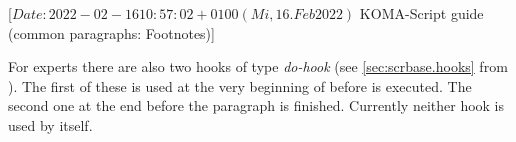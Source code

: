 %
%
%
%
%
%
%

                 [$Date: 2022-02-16 10:57:02 +0100 (Mi, 16. Feb 2022) $
                  KOMA-Script guide (common paragraphs: Footnotes)]

\begin{Declaration}
\end{Declaration}
%
For experts there are also two hooks
of type \emph{do-hook} (see \autoref{sec:scrbase.hooks} from
). The first of these is used at the very
beginning of  before
 is executed. The second one at the end
before the paragraph is finished. Currently neither hook is used by
\KOMAScript{} itself.%
\EndIndexGroup


